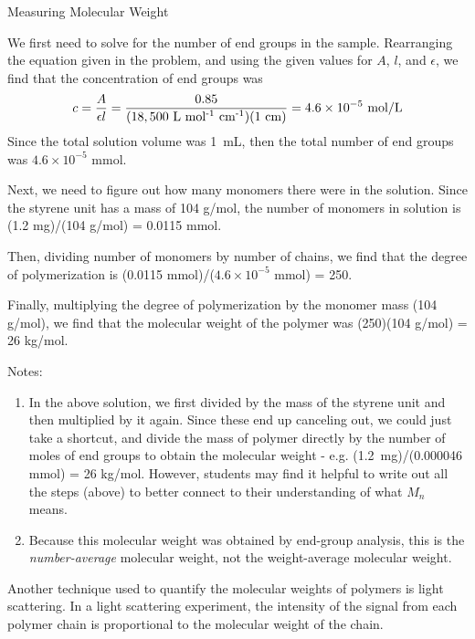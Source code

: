 \begin{activity}{Measuring Molecular Weight}
\begin{exercises}
		\begin{solution}{}
			We first need to solve for the number of end groups in the sample.  Rearranging the equation given in the problem, and using the given values for $A$, $l$, and $\epsilon$, we find that the concentration of end groups was
			\begin{equation*}
				c = \frac{A}{\epsilon l} = \frac{0.85}{(18,500\text{ L~mol\textsuperscript{-1}~cm\textsuperscript{-1}})(1\text{ cm})} = 4.6\times10^{-5}\text{ mol/L}
			\end{equation*}
			Since the total solution volume was 1~mL, then the total number of end groups was $4.6\times10^{-5}\text{ mmol}$.
			
			Next, we need to figure out how many monomers there were in the solution.  Since the styrene unit has a mass of 104 g/mol, the number of monomers in solution is (1.2 mg)/(104 g/mol) = 0.0115 mmol.
			
			Then, dividing number of monomers by number of chains, we find that the degree of polymerization is (0.0115 mmol)/($4.6\times10^{-5}\text{ mmol}$) = 250.
			
			Finally, multiplying the degree of polymerization by the monomer mass (104 g/mol), we find that the molecular weight of the polymer was (250)(104 g/mol) = 26 kg/mol.
			
			Notes:
				\begin{enumerate}
					\item In the above solution, we first divided by the mass of the styrene unit and then multiplied by it again.  Since these end up canceling out, we could just take a shortcut, and divide the mass of polymer directly by the number of moles of end groups to obtain the molecular weight - e.g. (1.2~mg)/(0.000046 mmol) = 26 kg/mol.  However, students may find it helpful to write out all the steps (above) to better connect to their understanding of what $M_n$ means.
					\item Because this molecular weight was obtained by end-group analysis, this is the \emph{number-average} molecular weight, not the weight-average molecular weight.
				\end{enumerate}
		\end{solution}
		
	
	\exercise Another technique used to quantify the molecular weights of polymers is light scattering.  In a light scattering experiment, the intensity of the signal from each polymer chain is proportional to the molecular weight of the chain.
	

\end{exercises}
\end{activity}

